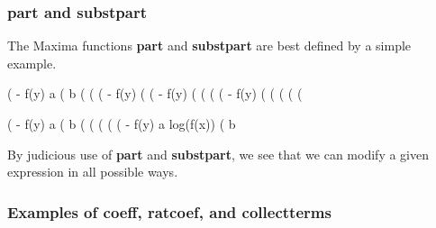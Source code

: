 \documentclass[11pt]{article}
\begin{document}
\subsubsection*{part and substpart}
The Maxima functions \textbf{part} and \textbf{substpart} are best
  defined by a simple example.
\begin{myVerbatim}
(%
                                 - f(y)
                             a %
(%
                                      b
(%
(%
(%
                                 - f(y)
(%
(%
                               - f(y)
(%
(%
(%
(%
                                   - f(y)
(%
(%
(%
(%
(%
\end{myVerbatim}
\newpage
\begin{myVerbatim}
(%
                                 - f(y)
                             a %
(%
                                      b
(%
(%
(%
(%
(%
                                           - f(y)
                             a log(f(x)) %
(%
                                      b
\end{myVerbatim}
By judicious use of \textbf{part} and \textbf{substpart}, we see that we can
  modify a given expression in all possible ways.
\subsubsection{Examples of \textbf{coeff}, \textbf{ratcoef}, and \textbf{collectterms}}
\end{document}
